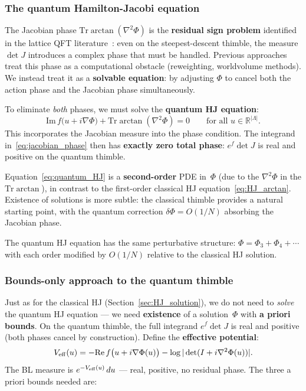 \documentclass[12pt]{article}
\theoremstyle{definition}
\theoremstyle{remark}
\newcommand{\R}{\mathbb{R}}
\newcommand{\Tr}{\mathrm{Tr}}
\newcommand{\La}{\Lambda}
\newcommand{\im}{\mathrm{Im}}
\newcommand{\re}{\mathrm{Re}}
\begin{document}
\subsubsection{The quantum Hamilton-Jacobi equation}
\label{sec:quantum_HJ}

The Jacobian phase $\Tr\arctan(\nabla^2\Phi)$ is the
\textbf{residual sign problem} identified in the lattice
QFT literature~\cite{CRS12,TNK15,Scorzato15,Fukuma20}:
even on the steepest-descent thimble, the measure $\det J$
introduces a complex phase that must be handled. Previous
approaches treat this phase as a computational obstacle
(reweighting, worldvolume methods). We instead treat it as a
\textbf{solvable equation}: by adjusting $\Phi$ to cancel both
the action phase and the Jacobian phase simultaneously.

To eliminate \emph{both} phases, we must solve the
\textbf{quantum HJ equation}:
\begin{equation}\label{eq:quantum_HJ}
  \boxed{\im\,f\bigl(u + i\nabla\Phi\bigr)
    + \Tr\arctan(\nabla^2\Phi) = 0
    \qquad\text{for all } u \in \R^{|\La|}.}
\end{equation}
This incorporates the Jacobian measure into the phase condition.
The integrand in~\eqref{eq:jacobian_phase} then has
\textbf{exactly zero total phase}: $e^{f}\det J$ is real and
positive on the quantum thimble.

Equation~\eqref{eq:quantum_HJ} is a \textbf{second-order} PDE
in~$\Phi$ (due to the $\nabla^2\Phi$ in the $\Tr\arctan$), in
contrast to the first-order classical HJ
equation~\eqref{eq:HJ_arctan}. Existence of solutions is more
subtle: the classical thimble provides a natural starting point,
with the quantum correction $\delta\Phi = O(1/N)$ absorbing
the Jacobian phase.

The quantum HJ equation has the same perturbative structure:
$\Phi = \Phi_3 + \Phi_4 + \cdots$ with each order modified by
$O(1/N)$ relative to the classical HJ solution.

\subsubsection{Bounds-only approach to the quantum thimble}
\label{sec:quantum_bounds}

Just as for the classical HJ (Section~\ref{sec:HJ_solution}),
we do not need to \emph{solve} the quantum HJ equation ---
we need \textbf{existence} of a solution~$\Phi$ with
\textbf{a priori bounds}. On the quantum thimble, the full
integrand $e^f \det J$ is real and positive (both phases cancel
by construction). Define the \textbf{effective potential}:
\begin{equation}
  V_{\rm eff}(u) = -\re\,f\bigl(u + i\nabla\Phi(u)\bigr)
    - \log|\det(I + i\nabla^2\Phi(u))|.
\end{equation}
The BL measure is $e^{-V_{\rm eff}(u)}\,du$ --- real, positive,
no residual phase. The three a priori bounds needed are:
\end{document}
